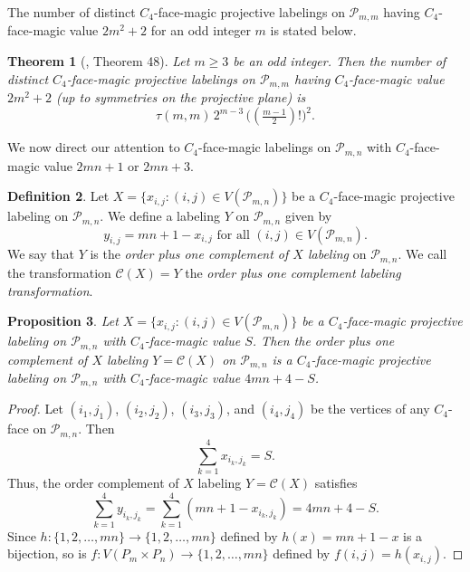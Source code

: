 \documentclass[12pt]{amsart}
\theoremstyle{definition}
\newtheorem{definition}{Definition}
\theoremstyle{plain}
\newtheorem{proposition}[definition]{Proposition}
\newtheorem{theorem}[definition]{Theorem}
\begin{document}
The number of distinct $C_4$-face-magic projective labelings on $\mathcal{P}_{m,m}$ having
$C_4$-face-magic value $2m^2+2$ for an odd integer $m$ is stated below.

\begin{theorem}[\cite{Curran2}, Theorem 48] \label{thmNumberOfCentrallyBalancedC4FaceMagicLabelingsOnSquare}
  Let $m \geqslant 3$ be an odd integer.
  Then the number of distinct $C_4$-face-magic projective labelings on $\mathcal{P}_{m,m}$ having $C_4$-face-magic value $2m^2+2$
  (up to symmetries on the projective plane) is
  \begin{equation*}
    \tau(m,m) \, 2^{m-3} \, \bigl( (\tfrac{m-1}{2})! \bigr)^2.
  \end{equation*}
\end{theorem}

We now direct our attention to $C_4$-face-magic labelings on $\mathcal{P}_{m,n}$  with $C_4$-face-magic value $2mn+1$ or $2mn+3$.

\begin{definition} \label{defnOrderComplementLabeling}
  Let $X=\{ x_{i,j} : (i,j)\in V(\mathcal{P}_{m,n})\}$ be a $C_4$-face-magic projective labeling on $\mathcal{P}_{m,n}$.
  We define a labeling $Y$ on $\mathcal{P}_{m,n}$ given by
  \begin{equation*}
   y_{i,j} = mn+1 -x_{i,j} \mbox{ \ \ \ for all } (i,j)\in V(\mathcal{P}_{m,n}).
  \end{equation*}
  We say that $Y$ is the \textit{order plus one complement of $X$ labeling} on $\mathcal{P}_{m,n}$.
  We call the transformation $\mathcal{C}(X)=Y$ the \textit{order plus one complement labeling transformation}.
\end{definition}

\begin{proposition} \label{propOrderComplemtLabeling}
  Let $X=\{ x_{i,j} : (i,j)\in V(\mathcal{P}_{m,n})\}$ be a $C_4$-face-magic projective labeling on $\mathcal{P}_{m,n}$
  with $C_4$-face-magic value $S$.
  Then the order plus one complement of $X$ labeling $Y=\mathcal{C}(X)$ on $\mathcal{P}_{m,n}$ is a $C_4$-face-magic projective labeling on $\mathcal{P}_{m,n}$
  with $C_4$-face-magic value $4mn+4-S$.
\end{proposition}

\begin{proof}
  Let $(i_1,j_1)$, $(i_2,j_2)$, $(i_3,j_3)$, and $(i_4,j_4)$ be the vertices of any $C_4$-face on $\mathcal{P}_{m,n}$. Then
  \begin{equation*}
    \sum_{k=1}^4 x_{i_k,j_k} = S.
  \end{equation*}
  Thus, the order complement of $X$ labeling $Y=\mathcal{C}(X)$ satisfies
   \begin{equation*}
    \sum_{k=1}^4 y_{i_k,j_k} =   \sum_{k=1}^4 (mn+1 -x_{i_k,j_k}) = 4mn+4-S.
  \end{equation*}
  Since $h:\{1,2,\ldots,mn\}\rightarrow \{1,2,\ldots,mn\}$ defined by $h(x)=mn+1-x$ is a bijection,
  so is $f:V(P_m \times P_n) \rightarrow \{1,2,\ldots,mn\}$ defined by $f(i,j)= h( x_{i,j})$.
\end{proof}
\end{document}
